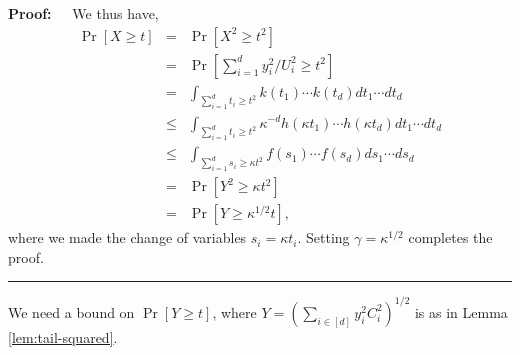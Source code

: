 \documentclass[11pt]{article}
\newenvironment{proof}{\begin{trivlist} \item {\bf Proof:~~}}
  {\qed\end{trivlist}}
\def\qed{\hfill\rule{2mm}{2mm}}
\begin{document}
\begin{proof}
We thus have,
\begin{eqnarray*}
\Pr[X \geq t] & = & \Pr[X^2 \geq t^2]\\
& = & \Pr[\sum_{i=1}^d y_i^2/U_i^2 \geq t^2]\\
& = & \int_{\sum_{i=1}^d t_i \geq t^2} k(t_1) \cdots k(t_d) dt_1 \cdots dt_d\\
& \leq & \int_{\sum_{i=1}^d t_i \geq t^2} \kappa^{-d} h(\kappa t_1) \cdots h(\kappa t_d) dt_1 \cdots dt_d\\
& \leq & \int_{\sum_{i=1}^d s_i \geq \kappa t^2} f(s_1) \cdots f(s_d) ds_1 \cdots ds_d\\
& = & \Pr[Y^2 \geq \kappa t^2]\\
& = & \Pr[Y \geq \kappa^{1/2} t],
\end{eqnarray*}
where we made the change of variables $s_i = \kappa t_i$. Setting $\gamma = \kappa^{1/2}$ completes the proof. 
\end{proof}
We need a bound on $\Pr[Y \geq t]$, where $Y = (\sum_{i \in [d]} y_i^2 C_i^2)^{1/2}$ is 
as in Lemma \ref{lem:tail-squared}.
\end{document}
